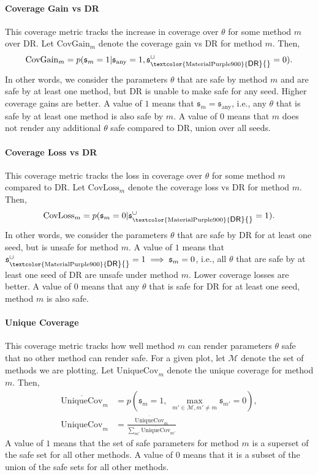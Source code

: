 \documentclass{article} %
\newcommand{\AlgDR}{\textcolor{MaterialPurple900}{\small\textsf{DR}}}
\begin{document}
\paragraph{Coverage Gain vs DR} This coverage metric tracks the increase in coverage over $\theta$ for some method $m$ over \AlgDR{}.
Let $\text{CovGain}_{m}$ denote the coverage gain vs DR for method $m$. Then,
\begin{equation}
    \text{CovGain}_{m} = p( \mathfrak{s}_{m} = 1 | \mathfrak{s}_{\text{any}}=1, \mathfrak{s}^\cup_{\text{\AlgDR{}}}=0 ).
\end{equation}
In other words, we consider the parameters $\theta$ that are safe by method $m$ and are safe by at least one method, but \AlgDR{} is unable to make safe for any seed. Higher coverage gains are better. 
A value of $1$ means that $\mathfrak{s}_m = \mathfrak{s}_{\text{any}}$, i.e., any $\theta$ that is safe by at least one method is also safe by $m$.
A value of $0$ means that $m$ does not render any additional $\theta$ safe compared to \AlgDR{}, union over all seeds.

\paragraph{Coverage Loss vs DR} This coverage metric tracks the loss in coverage over $\theta$ for some method $m$ compared to \AlgDR{}.
Let $\text{CovLoss}_{m}$ denote the coverage loss vs DR for method $m$. Then,
\begin{equation}
    \text{CovLoss}_{m} = p( \mathfrak{s}_{m} = 0 | \mathfrak{s}^\cup_{\text{\AlgDR{}}}=1 ).
\end{equation}
In other words, we consider the parameters $\theta$ that are safe by \AlgDR{} for at least one seed, but is unsafe for method $m$.
A value of $1$ means that $\mathfrak{s}^\cup_{\text{\AlgDR{}}} = 1 \implies \mathfrak{s}_m = 0$, i.e., all $\theta$ that are safe by at least one seed of \AlgDR{} are unsafe under method $m$. Lower coverage losses are better.
A value of $0$ means that any $\theta$ that is safe for \AlgDR{} for at least one seed, method $m$ is also safe.

\paragraph{Unique Coverage} This coverage metric tracks how well method $m$ can render parameters $\theta$ safe that no other method can render safe. For a given plot, let $\mathcal{M}$ denote the set of methods we are plotting.
Let $\text{UniqueCov}_{m}$ denote the unique coverage for method $m$. Then,
\begin{align}
    \overline{\text{UniqueCov}}_{m} &= p\left( \mathfrak{s}_{m} = 1, \; \max_{m' \in \mathcal{M}, m' \not= m} \mathfrak{s}_{m'} = 0 \right), \\
    \text{UniqueCov}_m &= \frac{ \overline{\text{UniqueCov}}_{m} }{ \sum_{m'} \overline{\text{UniqueCov}}_{m'} }
\end{align}
A value of $1$ means that the set of safe parameters for method $m$ is a superset of the safe set for all other methods.
A value of $0$ means that it is a subset of the union of the safe sets for all other methods.
\end{document}
